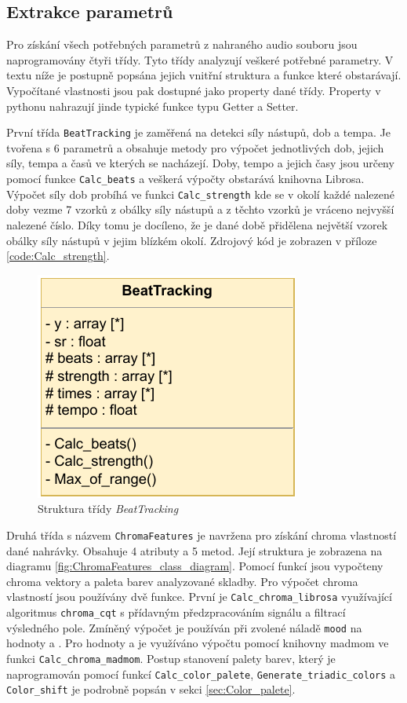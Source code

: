 \subsection{Extrakce parametrů} \label{sec:Parameter_extraction}
Pro získání všech potřebných parametrů z nahraného audio souboru jsou naprogramovány čtyři třídy. Tyto třídy analyzují veškeré potřebné parametry. V textu níže je postupně popsána jejich vnitřní struktura a funkce které obstarávají. Vypočítané vlastnosti jsou pak dostupné jako property dané třídy. Property v pythonu nahrazují jinde typické funkce typu Getter a Setter.

První třída \texttt{BeatTracking} je zaměřená na detekci síly nástupů, dob a tempa. Je tvořena s 6 parametrů a obsahuje metody pro výpočet jednotlivých dob, jejich síly, tempa a časů ve kterých se nacházejí. Doby, tempo a jejich časy jsou určeny pomocí funkce \texttt{Calc\_beats} a veškerá výpočty obstarává knihovna Librosa. Výpočet síly dob probíhá ve funkci \texttt{Calc\_strength} kde se v okolí každé nalezené doby vezme 7 vzorků z obálky síly nástupů a z těchto vzorků je vráceno nejvyšší nalezené číslo. Díky tomu je docíleno, že je dané době přidělena největší vzorek obálky síly nástupů v jejim blízkém okolí. Zdrojový kód je zobrazen v příloze \ref{code:Calc_strength}.

\begin{figure}[H]
    \centering
        \includegraphics[width = 0.3\linewidth]{obrazky/UML_diagramy_BeatTracking.pdf}
        \caption{Struktura třídy \textit{BeatTracking}}
        \label{fig:BeatTracking_class_diagram}
\end{figure}

Druhá třída s názvem \texttt{ChromaFeatures} je navržena pro získání chroma vlastností dané nahrávky. Obsahuje 4 atributy a 5 metod. Její struktura je zobrazena na diagramu \ref{fig:ChromaFeatures_class_diagram}. Pomocí funkcí jsou vypočteny chroma vektory a paleta barev analyzované skladby. Pro výpočet chroma vlastností jsou používány dvě funkce. První je \texttt{Calc\_chroma\_librosa} využívající algoritmus \texttt{chroma\_cqt} s přídavným předzpracováním signálu a filtrací výsledného pole. Zmíněný výpočet je používán při zvolené náladě \texttt{mood} na hodnoty  a . Pro hodnoty  a  je využíváno výpočtu pomocí knihovny madmom ve funkci \texttt{Calc\_chroma\_madmom}. Postup stanovení palety barev, který je naprogramován pomocí funkcí \texttt{Calc\_color\_palete}, \texttt{Generate\_triadic\_colors} a \texttt{Color\_shift} je podrobně popsán v sekci \ref{sec:Color_palete}.

